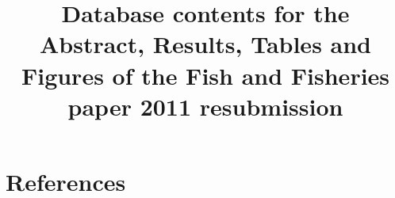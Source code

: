 \documentclass[letterpaper,review,authoryear,12pt]{myelsarticle}
\begin{document}
\begin{frontmatter}
\title{Database contents for the Abstract, Results, Tables and Figures of the Fish and Fisheries paper 2011 resubmission}

\end{frontmatter}




\section*{References}







\end{document}
